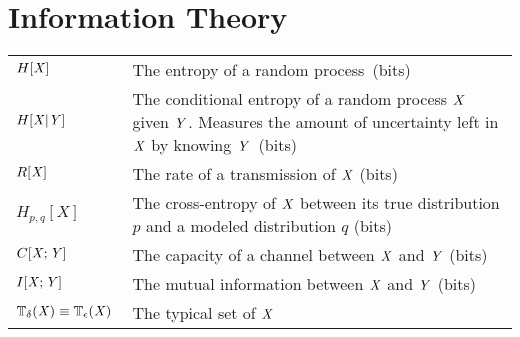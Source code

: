 \section*{Information Theory}
\bgroup{}
\begin{tabular}{>{\centering}p{1.2in}p{4in}}
\(\displaystyle H[{\mathit{X}}]~\) & The entropy of a random process~(bits)\\
\(\displaystyle H[{\mathit{X}}|{\mathit{Y}}]~\) & The conditional entropy of a random process ${\mathit{X}}$ given ${\mathit{Y}}$. Measures the amount of uncertainty left in ${\mathit{X}}$ by knowing ${\mathit{Y}}$~(bits)\\
\(\displaystyle R[{\mathit{X}}]~\) & The rate of a transmission of ${\mathit{X}}$ (bits)\\
\(\displaystyle H_{p,q}[X]\) & The cross-entropy of ${\mathit{X}}$ between its true distribution $p$ and a modeled distribution $q$ (bits)\\
\(\displaystyle C[{\mathit{X}};{\mathit{Y}}]~\) & The capacity of a channel between ${\mathit{X}}$ and ${\mathit{Y}}$ (bits)\\
\(\displaystyle I[{\mathit{X}};{\mathit{Y}}]~\) & The mutual information between  ${\mathit{X}}$ and ${\mathit{Y}}$ (bits)\\

\(\displaystyle {\mathbb{T}}_\delta({\mathit{X}}) \equiv {\mathbb{T}}_\epsilon({\mathit{X}})~\) & The  typical set of ${\mathit{X}}$\\
\end{tabular}
\egroup{}
\clearpage